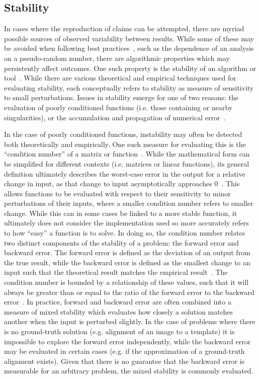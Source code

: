 \subsection{Stability}
\label{sec:bg_stab}
In cases where the reproduction of claims can be attempted, there are myriad possible sources of observed variability
between results. While some of these may be avoided when following best practices~\cite{prlic2012ten},
such as the dependence of an analysis on a pseudo-random number, there are algorithmic properties which may
persistently affect outcomes. One such property is the stability of an algorithm or tool~\cite{higham2002accuracy}.
While there are various theoretical and empirical techniques used for evaluating stability, each conceptually refers to
stability as measure of sensitivity to small perturbations. Issues in stability emerge for one of two reasons: the
evaluation of poorly conditioned functions (i.e. those containing or nearby singularities), or the accumulation and
propagation of numerical error~\cite{higham2002accuracy}.

In the case of poorly conditioned functions, instability may often be detected both theoretically and empirically. One
such measure for evaluating this is the ``condition number'' of a matrix or function~\cite{belsley2005regression}. While
the mathematical form can be simplified for different contexts (i.e. matrices or linear functions), its general
definition ultimately describes the worst-case error in the output for a relative change in input, as that change to input
asymptotically approaches $0$~\cite{belsley2005regression}. This allows functions to be evaluated with respect to
their sensitivity to minor perturbations of their inputs, where a smaller condition number refers to smaller change.
While this can in some cases be linked to a more stable function, it ultimately does not consider the implementation used
so more accurately refers to how ``easy'' a function is to solve. In doing so, the condition number relates two distinct
components of the stability of a problem: the forward error and backward error. The forward error is defined as the
deviation of an output from the true result, while the backward error is defined as the smallest change to an input such
that the theoretical result matches the empirical result~\cite{higham2002accuracy}. The condition number is bounded by a
relationship of these values, such that it will always be greater than or equal to the ratio of the forward error to the
backward error~\cite{belsley2005regression}. In practice, forward and backward error are often combined into a measure of
mixed stability which evaluates how closely a solution matches another when the input is perturbed slightly. In the case
of problems where there is no ground-truth solution (e.g. alignment of an image to a template) it is impossible to
explore the forward error independently, while the backward error may be evaluated in certain cases (e.g. if the
approximation of a ground-truth alignment exists). Given that there is no guarantee that the backward error is measurable
for an arbitrary problem, the mixed stability is commonly evaluated.

